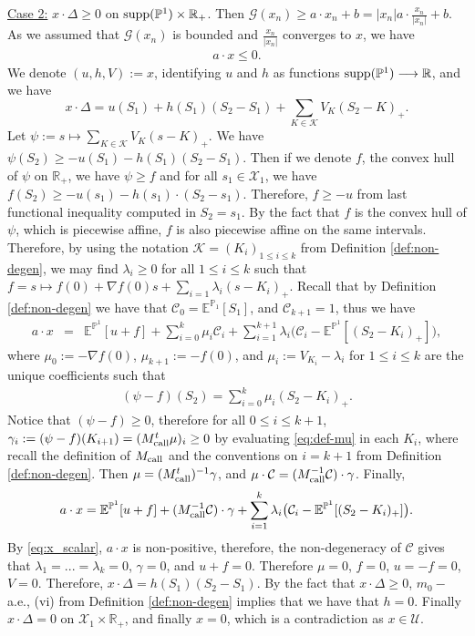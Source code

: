 \documentclass{amsart}%
\def\be{\begin{eqnarray}}
\def\ee{\end{eqnarray}}
\def\b*{\begin{eqnarray*}}
\def\e*{\end{eqnarray*}}
\def \E{\mathbb{E}}
\def \P{{\mathbb P}}
\def \R{\mathbb{R}}
\def\Cc{{\cal C}}
\def\Gc{{\cal G}}
\def\Kc{{\cal K}}
\def\Uc{{\cal U}}
\def\no{\noindent}
\def\x{\times}
\theoremstyle{definition}
\theoremstyle{remark}
\newcommand{\X}{\mathcal{X}}
\newcommand{\cal}{\mathcal}
\begin{document}
\no\underline{\rm Case 2:} $x\cdot \Delta \ge 0$ on ${\rm supp}(\P^1)\x\R_+$. Then $\Gc(x_n)\ge a\cdot x_n +b = |x_n|a\cdot \frac{x_n}{|x_n|} +b$. As we assumed that $\Gc(x_n)$ is bounded and $\frac{x_n}{|x_n|}$ converges to $x$, we have
\be\label{eq:x_scalar}
a\cdot x \le 0.
\ee
We denote $(u,h,V):=x$, identifying $u$ and $h$ as functions ${\rm supp}(\P^1)\longrightarrow \R$, and we have
$$x\cdot \Delta = u(S_1)+h(S_1)(S_2-S_1)+\sum_{K\in\Kc}V_K(S_2-K)_+.$$
Let $\psi:=s\mapsto\sum_{K\in\Kc}V_K(s-K)_+$. We have $\psi(S_2)\ge -u(S_1)-h(S_1)(S_2-S_1)$. Then if we denote $f$, the convex hull of $\psi$ on $\R_+$, we have $\psi\ge f$ and for all $s_1\in\X_1$, we have $f(S_2)\ge -u(s_1)-h(s_1)\cdot(S_2-s_1)$. Therefore, $f\ge -u$ from last functional inequality computed in $S_2 = s_1$. By the fact that $f$ is the convex hull of $\psi$, which is piecewise affine, $f$ is also piecewise affine on the same intervals. Therefore, by using the notation $\Kc = (K_i)_{1\le i\le k}$ from Definition \ref{def:non-degen}, we may find $\lambda_i\ge 0$ for all $1\le i\le k$ such that $f = s\mapsto f(0)+\nabla f(0)s+\sum_{i=1}\lambda_i(s-K_i)_+$. Recall that by Definition \ref{def:non-degen} we have that $\Cc_0 = \E^{\P_1}[S_1]$, and $\Cc_{k+1} = 1$, thus we have
\b*
a\cdot x &=& \E^{\P^1}[u+f]+\sum_{i=0}^k \mu_i\Cc_i+\sum_{i=1}^{k+1}\lambda_i\big(\Cc_i-\E^{\P^1}[(S_2-K_i)_+]\big),
\e*
where $\mu_0 := -\nabla f(0)$, $\mu_{k+1}:= -f(0)$, and $\mu_i:=V_{K_i}-\lambda_i$ for $1\le i\le k$ are the unique coefficients such that
\be\label{eq:def-mu}
(\psi-f)(S_2) = \sum_{i=0}^k\mu_i(S_2-K_i)_+.
\ee
Notice that $(\psi-f)\ge 0$, therefore for all $0\le i\le k+1$, $\gamma_i := (\psi-f)(K_{i+1}) = (M_{\rm call}^t\mu)_i \ge 0$ by evaluating \eqref{eq:def-mu} in each $K_i$, where recall the definition of $M_{\rm call}$ and the conventions on $i=k+1$ from Definition \ref{def:non-degen}. Then $\mu = (M_{\rm call}^t)^{-1}\gamma$, and $\mu\cdot \Cc = (M_{\rm call}^{-1}\Cc)\cdot \gamma$. Finally,
$$a\cdot x = \E^{\P^1}[u+f]+(M_{\rm call}^{-1}\Cc)\cdot \gamma+\sum_{i=1}^k\lambda_i\big(\Cc_i-\E^{\P^1}[(S_2-K_i)_+]\big).$$
By \eqref{eq:x_scalar}, $a\cdot x$ is non-positive, therefore, the non-degeneracy of $\Cc$ gives that $\lambda_1 = ... = \lambda_k = 0$, $\gamma = 0$, and $u+f = 0$. Therefore $\mu = 0$, $f = 0$, $u = -f = 0$, $V = 0$. Therefore, $x\cdot \Delta = h(S_1)(S_2-S_1)$. By the fact that $x\cdot \Delta\ge 0$, $m_0-$a.e., (vi) from Definition \ref{def:non-degen} implies that we have that $h=0$. Finally $x\cdot\Delta = 0$ on $\X_1\x\R_+$, and finally $x=0$, which is a contradiction as $x\in \Uc$.
\end{document}
